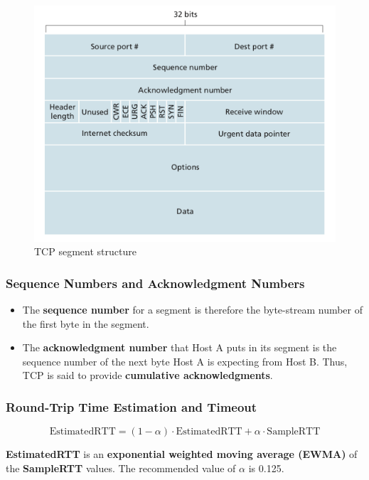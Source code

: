 \documentclass[11pt]{article}
\begin{document}
\begin{figure}[h]
	\centering
	\includegraphics[width=0.8\linewidth]{images/tcp.png}
	\caption{TCP segment structure}
	\label{fig:tcp}
\end{figure}

\subsubsection{Sequence Numbers and Acknowledgment Numbers}

\begin{itemize}

	\item 
	
	The \textbf{sequence number} for a segment is therefore the byte-stream number of the first byte in the segment. 
	
	\item 
	
	The \textbf{acknowledgment number} that Host A puts in its segment is the sequence number of the next byte Host A is expecting from Host B. Thus, TCP is said to provide \textbf{cumulative acknowledgments}.
\end{itemize}

\subsubsection{Round-Trip Time Estimation and Timeout}

\[
	\mathrm{EstimatedRTT} = (1 - \alpha) \cdot \mathrm{EstimatedRTT} + \alpha \cdot \mathrm{SampleRTT}
\]

\textbf{EstimatedRTT} is an \textbf{exponential weighted moving average (EWMA)} of the \textbf{SampleRTT} values. The recommended value of $\alpha$ is 0.125.
\end{document}
